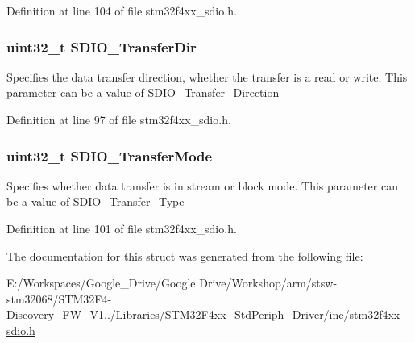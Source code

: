 Definition at line 104 of file stm32f4xx\-\_\-sdio.\-h.

\hypertarget{struct_s_d_i_o___data_init_type_def_a8e3f15e7eab553fd3be0419ad809c3de}{
\subsubsection[{S\-D\-I\-O\-\_\-\-Transfer\-Dir}]{\setlength{\rightskip}{0pt plus 5cm}uint32\-\_\-t S\-D\-I\-O\-\_\-\-Transfer\-Dir}}\label{struct_s_d_i_o___data_init_type_def_a8e3f15e7eab553fd3be0419ad809c3de}
Specifies the data transfer direction, whether the transfer is a read or write. This parameter can be a value of \hyperlink{group___s_d_i_o___transfer___direction}{S\-D\-I\-O\-\_\-\-Transfer\-\_\-\-Direction} 

Definition at line 97 of file stm32f4xx\-\_\-sdio.\-h.

\hypertarget{struct_s_d_i_o___data_init_type_def_ab5a77921227a04c3aeb383b794c2a64c}{
\subsubsection[{S\-D\-I\-O\-\_\-\-Transfer\-Mode}]{\setlength{\rightskip}{0pt plus 5cm}uint32\-\_\-t S\-D\-I\-O\-\_\-\-Transfer\-Mode}}\label{struct_s_d_i_o___data_init_type_def_ab5a77921227a04c3aeb383b794c2a64c}
Specifies whether data transfer is in stream or block mode. This parameter can be a value of \hyperlink{group___s_d_i_o___transfer___type}{S\-D\-I\-O\-\_\-\-Transfer\-\_\-\-Type} 

Definition at line 101 of file stm32f4xx\-\_\-sdio.\-h.



The documentation for this struct was generated from the following file\-:\begin{DoxyCompactItemize}
\item 
E\-:/\-Workspaces/\-Google\-\_\-\-Drive/\-Google Drive/\-Workshop/arm/stsw-\/stm32068/\-S\-T\-M32\-F4-\/\-Discovery\-\_\-\-F\-W\-\_\-\-V1../\-Libraries/\-S\-T\-M32\-F4xx\-\_\-\-Std\-Periph\-\_\-\-Driver/inc/\hyperlink{stm32f4xx__sdio_8h}{stm32f4xx\-\_\-sdio.\-h}\end{DoxyCompactItemize}
